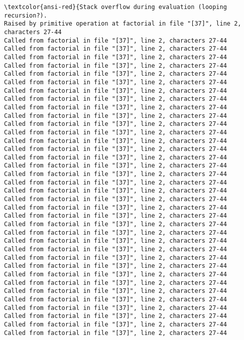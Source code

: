 \documentclass[11pt]{article}
\begin{document}
    \begin{Verbatim}[commandchars=\\\{\}, frame=single, framerule=2mm, rulecolor=\color{outerrorbackground}]
\textcolor{ansi-red}{Stack overflow during evaluation (looping recursion?).
Raised by primitive operation at factorial in file "[37]", line 2, characters 27-44
Called from factorial in file "[37]", line 2, characters 27-44
Called from factorial in file "[37]", line 2, characters 27-44
Called from factorial in file "[37]", line 2, characters 27-44
Called from factorial in file "[37]", line 2, characters 27-44
Called from factorial in file "[37]", line 2, characters 27-44
Called from factorial in file "[37]", line 2, characters 27-44
Called from factorial in file "[37]", line 2, characters 27-44
Called from factorial in file "[37]", line 2, characters 27-44
Called from factorial in file "[37]", line 2, characters 27-44
Called from factorial in file "[37]", line 2, characters 27-44
Called from factorial in file "[37]", line 2, characters 27-44
Called from factorial in file "[37]", line 2, characters 27-44
Called from factorial in file "[37]", line 2, characters 27-44
Called from factorial in file "[37]", line 2, characters 27-44
Called from factorial in file "[37]", line 2, characters 27-44
Called from factorial in file "[37]", line 2, characters 27-44
Called from factorial in file "[37]", line 2, characters 27-44
Called from factorial in file "[37]", line 2, characters 27-44
Called from factorial in file "[37]", line 2, characters 27-44
Called from factorial in file "[37]", line 2, characters 27-44
Called from factorial in file "[37]", line 2, characters 27-44
Called from factorial in file "[37]", line 2, characters 27-44
Called from factorial in file "[37]", line 2, characters 27-44
Called from factorial in file "[37]", line 2, characters 27-44
Called from factorial in file "[37]", line 2, characters 27-44
Called from factorial in file "[37]", line 2, characters 27-44
Called from factorial in file "[37]", line 2, characters 27-44
Called from factorial in file "[37]", line 2, characters 27-44
Called from factorial in file "[37]", line 2, characters 27-44
Called from factorial in file "[37]", line 2, characters 27-44
Called from factorial in file "[37]", line 2, characters 27-44
Called from factorial in file "[37]", line 2, characters 27-44
Called from factorial in file "[37]", line 2, characters 27-44
Called from factorial in file "[37]", line 2, characters 27-44
Called from factorial in file "[37]", line 2, characters 27-44
Called from factorial in file "[37]", line 2, characters 27-44

\end{Verbatim}
\end{document}
